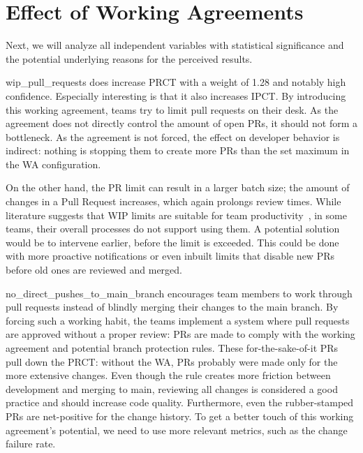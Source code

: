 \section{Effect of Working Agreements}


Next, we will analyze all independent variables with statistical significance and the potential underlying reasons for the perceived results.


wip\_pull\_requests does increase PRCT with a weight of 1.28 and notably high confidence. Especially interesting is that it also increases IPCT. By introducing this working agreement, teams try to limit pull requests on their desk. As the agreement does not directly control the amount of open PRs, it should not form a bottleneck. As the agreement is not forced, the effect on developer behavior is indirect: nothing is stopping them to create more PRs than the set maximum in the WA configuration. 

On the other hand, the PR limit can result in a larger batch size; the amount of changes in a Pull Request increases, which again prolongs review times. While literature suggests that WIP limits are suitable for team productivity~\cite{reinertsen_principles_2009}, in some teams, their overall processes do not support using them. A potential solution would be to intervene earlier, before the limit is exceeded. This could be done with more proactive notifications or even inbuilt limits that disable new PRs before old ones are reviewed and merged. 

no\_direct\_pushes\_to\_main\_branch encourages team members to work through pull requests instead of blindly merging their changes to the main branch. By forcing such a working habit, the teams implement a system where pull requests are approved without a proper review: PRs are made to comply with the working agreement and potential branch protection rules. These for-the-sake-of-it PRs pull down the PRCT: without the WA, PRs probably were made only for the more extensive changes. Even though the rule creates more friction between development and merging to main, reviewing all changes is considered a good practice and should increase code quality. Furthermore, even the rubber-stamped PRs are net-positive for the change history. To get a better touch of this working agreement's potential, we need to use more relevant metrics, such as the change failure rate. 

